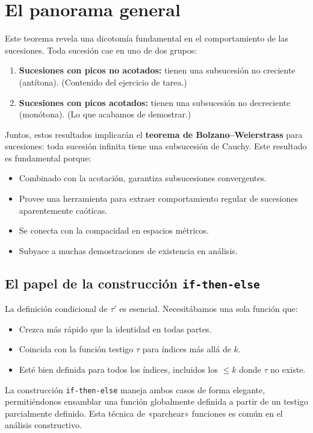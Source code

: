 \section{El panorama general}

Este teorema revela una dicotomía fundamental en el comportamiento de las
sucesiones. Toda sucesión cae en uno de dos grupos:

\begin{enumerate}
  \item \textbf{Sucesiones con picos no acotados:} tienen una subsucesión
        no creciente (antítona). (Contenido del ejercicio de tarea.)
  \item \textbf{Sucesiones con picos acotados:} tienen una subsucesión no
        decreciente (monótona). (Lo que acabamos de demostrar.)
\end{enumerate}

Juntos, estos resultados implicarán el \textbf{teorema de Bolzano--Weierstrass}
para sucesiones: toda sucesión infinita tiene una subsucesión de Cauchy.
Este resultado es fundamental porque:
\begin{itemize}
  \item Combinado con la acotación, garantiza subsucesiones convergentes.
  \item Provee una herramienta para extraer comportamiento regular de
        sucesiones aparentemente caóticas.
  \item Se conecta con la compacidad en espacios métricos.
  \item Subyace a muchas demostraciones de existencia en análisis.
\end{itemize}

\subsection{El papel de la construcción \texttt{if-then-else}}

La definición condicional de $\tau'$ es esencial. Necesitábamos una sola
función que:
\begin{itemize}
  \item Crezca más rápido que la identidad en todas partes.
  \item Coincida con la función testigo $\tau$ para índices más allá de $k$.
  \item Esté bien definida para todos los índices, incluidos los $\leq k$
        donde $\tau$ no existe.
\end{itemize}

La construcción \texttt{if-then-else} maneja ambos casos de forma elegante,
permitiéndonos ensamblar una función globalmente definida a partir de un
testigo parcialmente definido. Esta técnica de «parchear» funciones es común
en el análisis constructivo.

